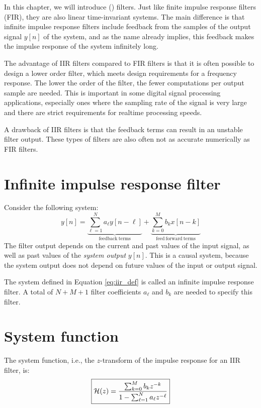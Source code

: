 In this chapter, we will introduce  () filters. Just like finite
impulse response filters (FIR), they are also linear time-invariant
systems. The main difference is that infinite impulse response filters
include feedback from the samples of the output signal $y[n]$ of the
system, and as the name already implies, this feedback makes the
impulse response of the system infinitely long.

The advantage of IIR filters compared to FIR filters is that it is
often possible to design a lower order filter, which meets design
requirements for a frequency response. The lower the order of the
filter, the fewer computations per output sample are needed. This is
important in some digital signal processing applications, especially
ones where the sampling rate of the signal is very large and there are
strict requirements for realtime processing speeds.

A drawback of IIR filters is that the feedback terms can result in an
unstable filter output. These types of filters are also often not
as accurate numerically as FIR filters.

\section{Infinite impulse response filter}
Consider the following system:
\begin{equation}
\boxed{
y[n] = \underbrace{\sum_{\ell=1}^{N} a_{\ell} y[n-\ell]}_{\mathrm{feedback~terms}} + \underbrace{\sum_{k=0}^{M} b_k x[n-k]}_{\mathrm{feed~forward~terms}}
\label{eq:iir_def}
}
\end{equation}
The filter output depends on the current and past values of the input
signal, as well as past values of the \emph{system output}
$y[n]$. This is a causal system, because the system output does not
depend on future values of the input or output signal.

The system defined in Equation \ref{eq:iir_def} is called an infinite
impulse response filter. A total of $N+M+1$ filter coefficients
$a_{\ell}$ and $b_k$ are needed to specify this filter.

\section{System function}

The system function, i.e., the $z$-transform of the impulse response for an IIR filter, is:
\begin{equation}
\boxed{
\mathcal{H}(z) = \frac{\sum_{k=0}^{M}b_k z^{-k}}{1-\sum_{\ell=1}^{N}a_\ell z^{-\ell}}
\label{eq:iir_system_gen}
}
\end{equation}

